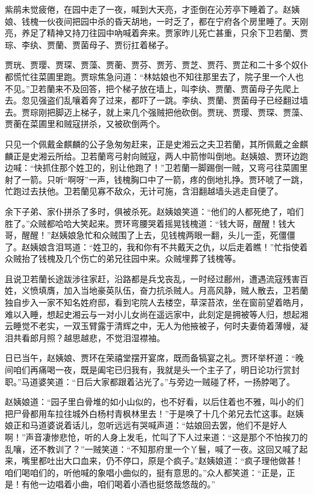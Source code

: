 \documentclass[12pt,oneside]{book}
\begin{document}
紫鹃未觉疲倦，在园中走了一夜，喊到大天亮，才歪倒在沁芳亭下睡着了。赵姨娘、钱槐一伙夜间把园中杀的昏天胡地，一时乏了，都在宁府各个房里睡了。天刚亮，养足了精神又持刀往园中吶喊着奔来。贾家昨儿死亡甚重，只余下卫若蘭、贾琮、李纨、贾蘭、贾菌母子、贾衍扛着梯子。

贾珖、贾璎、贾琛、贾藻、贾蘅、贾芬、贾芳、贾芝、贾荇、贾芷和二十多个奴仆都慌忙往菜圃里跑。贾琮焦急问道：“林姑娘也不知往那里去了，院子里一个人也不见。”卫若蘭来不及回答，把个梯子放在墙上，叫李纨、贾蘭、贾菌母子先爬上去。忽见强盗们乱嚷着奔了过来，都吓了一跳。李纨、贾蘭、贾菌母子已经翻过墙去。贾琮刚把脚迈上梯子，就上来几个强贼把他砍倒。贾珖、贾璎、贾琛、贾藻、贾蘅在菜圃里和贼寇拼杀，又被砍倒两个。

只见一个佩戴金麒麟的公子急匆匆赶来，正是史湘云之夫卫若蘭，其所佩戴之金麒麟正是史湘云所给。卫若蘭弯弓射向贼寇，两人中箭惨叫倒地。赵姨娘、贾环边跑边喊：“快抓住那个姓卫的，别让他跑了！”卫若蘭一脚踢倒一贼，又弯弓往菜圃里射了一箭。只听“啊呀”一声，钱槐胸口中了一箭，疼的倒地扎挣。贾环唬了一跳，忙跑过去扶他。卫若蘭见寡不敌众，无计可施，含泪翻越墙头逃走自便了。

余下子弟、家仆拼杀了多时，俱被杀死。赵姨娘笑道：“他们的人都死绝了，咱们胜了。”众贼都哈哈大笑起来。贾环弯腰哭着摇晃钱槐道：“钱大哥，醒醒！钱大哥，醒醒！”赵姨娘急忙和众贼围了上去，见钱槐两眼一翻，头儿一歪，死僵僵了。赵姨娘含泪骂道：“姓卫的，我和你有不共戴天之仇，以后走着瞧！”忙指使着众贼抬了钱槐及几个伤亡的弟兄往园中来。众贼埋葬了钱槐等。

且说卫若蘭长途跋涉往家赶，沿路都是兵戈丧乱，一时经过鄜州，遭遇流寇残害百姓，义愤填膺，加入当地豪英队伍，奋力抗杀贼人。月高风静，贼人散去，卫若蘭独自步入一家不知名姓府邸，看到宅院人去楼空，草深苔浓，坐在窗前望着皓月，难以入睡，想起史湘云与一对小儿女尚在遥远家中，此刻定是拥被等人归，想起湘云睡觉不老实，一双玉臂露于清辉之中，无人为他掖被子，何时夫妻倚着薄幔，凝泪共看郎月照？越思越悲，不觉泪湿襟袖。

日已当午，赵姨娘、贾环在荣禧堂摆开宴席，既而备犒宴之礼。贾环举杯道：“晚间咱们再痛喝一夜，既是阖宅已归我有，我就是头一个主子了，明日论功行赏封职。”马道婆笑道：“日后大家都跟着沾光了。”与旁边一贼碰了杯，一扬脖喝了。

赵姨娘道：“园子里白骨堆的如小山似的，也不好看，以后住着也不雅，叫小的们把尸骨都用车拉往城外白杨村青枫林里去！”于是唤了十几个弟兄去忙这事。赵姨娘正和马道婆说着话儿，忽听远远有哭喊声道：“姑娘回去罢，他们不是好人啊！”声音凄惨悲怆，听的人身上发毛，忙叫了下人过来道：“这是那个不怕挨刀的乱嚷，还不教训了？”一贼笑道：“不知那府里一个丫鬟，喊了一夜。这回又喊了起来，嘴里都吐出大口血来，仍不停口，原是个疯子。”赵姨娘道：“疯子理他做甚！咱们喝咱们的，听他喊的象唱小曲似的，挺有意思的。”众人都笑道：“正是，正是！有他一边唱着小曲，咱们喝着小酒也挺悠哉悠哉的。”
\end{document}

